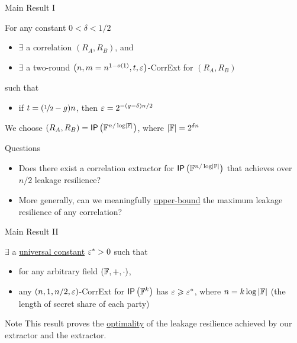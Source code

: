 \begin{frame}{Main Result I}
	\begin{theorem}
	\label{thm:construction}
	For any constant $0<\delta<1/2$
	\begin{itemize}
		\item $ \exists $ a correlation $(R_A,R_B)$, and
		\item $ \exists $ a two-round $\left(n,m = n^{1-o(1)},t,\varepsilon\right)$-CorrExt for $(R_A,R_B)$
	\end{itemize}
	such that 
	\begin{itemize}
		\item if $t=(\nicefrac12-g)n$, then $\varepsilon=2^{-(g-\delta)n/2}$
	\end{itemize} 
	\end{theorem}
	\pause
	We choose $ (R_A, R_B) = \IP[\bbF^{n/ \log \abs \bbF}] $, where $ \left\vert{\ensuremath{{\mathbb F}}}\right\vert = 2^{\delta n} $
	\pause 
	{
	\begin{block}{Questions}
		\begin{itemize}
		\item Does there exist a correlation extractor for $ \IP[\bbF^{n/ \log \abs \bbF}] $ that achieves over $ n/2 $ leakage resilience? \pause
		\item More generally, can we meaningfully \underline{upper-bound} the maximum leakage resilience of any correlation? 
		\end{itemize}
	\end{block}
	}
\end{frame}



\begin{frame}{Main Result II}
	\begin{theorem}
	\label{thm:hardness} 
	$ \exists $ a \underline{universal constant} $\varepsilon^*>0$ such that
	\begin{itemize}
		\item for any arbitrary field $({\mathbb F},+,\cdot)$,
		\item any $(n,1,%
		n/2,\eps)$-CorrExt for $ \IP [\bbF^k] $ has $\varepsilon\geqslant\varepsilon^*$, where $n=k\log\left\vert{\ensuremath{{\mathbb F}}}\right\vert$ (the length of secret share of each party)  
	\end{itemize}
\end{theorem}
\pause
{
\begin{block}{Note}
	This result proves the \underline{optimality} of the leakage resilience achieved by our extractor and the \cite{C:GIMS15} extractor.
\end{block}}

\end{frame}